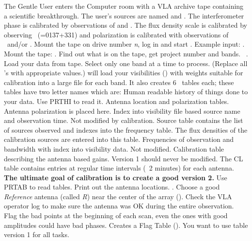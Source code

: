 The Gentle User enters the Computer room with a VLA archive tape
containing a scientific breakthrough.  The user's sources are named
 and .  The interferometer phase is
calibrated by observations of  and .  The flux
density scale is calibrated by observing \TCTES\ (=0137+331) and
polarization is calibrated with observations of \TCPCL\ and/or \TCOTE.
Mount the tape on drive number {\it n}, log in and start \AIPS. Example
input: .  Mount the tape:
.
\beddes
{} Find out what is on the tape, get project number
   and bands.~
.
 Load your data from tape.
Select only one band at a time to process.
(Replace all 's with appropriate values.)  will
load your visibilities (\uvdata) with weights suitable for calibration
into a large file for each band.  It also creates 6 \AIPS\ tables
each; these tables have two letter names which are:
\tablestyle
\beddes
{} Human readable history of things done to your data.
Use PRTHI to read it.
 Antenna location and polarization tables.  Antenna
polarization  is placed here.
 Index into visibility file based source name and
observation time.  Not modified by calibration.
 Source table contains the list of sources observed
and indexes into the frequency table.  The flux densities of the
calibration sources are entered into this table.
 Frequencies of observation and bandwidth with index
into visibility data. Not modified.
 Calibration table describing the antenna based gains.
Version 1 should never be modified.
The CL table contains entries at regular time intervals (\ie\ 2
minutes) for each antenna.
{\bf The ultimate goal of calibration is to create a good \CL version 2.}
Use PRTAB to read tables.
\eeddes
\normalstyle
{} Print out the antenna locations.
.
Choose a good {\it Reference} antenna (called {\it R}) near the center
of the array ().  Check the VLA operator log to make
sure the antenna was OK during the entire observation.
 Flag the bad points at the beginning of each
scan, even the ones with good amplitudes could have bad phases.
Creates a Flag Table ().  You want to use  table
version 1 for all tasks.
